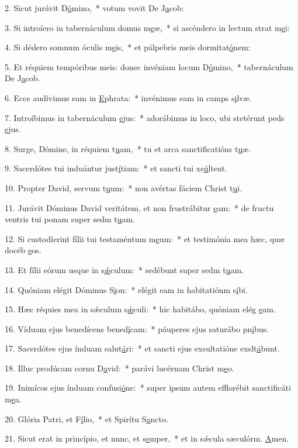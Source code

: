 2. Sicut jurávit D\uline{ó}mino,~* votum vovit De J\uline{a}cob:\par 
3. Si introíero in tabernáculum domus m\uline{e}æ,~* si ascéndero in lectum strat m\uline{e}i:\par 
4. Si dédero somnum óculis m\uline{e}is,~* et pálpebris meis dormitat\uline{ó}nem:\par 
5. Et réquiem tempóribus meis: donec invéniam locum D\uline{ó}mino,~* tabernáculum De J\uline{a}cob.\par 
6. Ecce audívimus eam in \uline{E}phrata:~* invénimus eam in camps s\uline{i}lvæ.\par 
7. Introíbimus in tabernáculum \uline{e}jus:~* adorábimus in loco, ubi stetérunt peds \uline{e}jus.\par 
8. Surge, Dómine, in réquiem t\uline{u}am,~* tu et arca sanctificatións t\uline{u}æ.\par 
9. Sacerdótes tui induántur just\uline{í}tiam:~* et sancti tui xs\uline{ú}ltent.\par 
10. Propter David, servum t\uline{u}um:~* non avértas fáciem Christ t\uline{u}i.\par 
11. Jurávit Dóminus David veritátem, et non frustrábitur \uline{e}am:~* de fructu ventris tui ponam super sedm t\uline{u}am.\par 
12. Si custodíerint fílii tui testaméntum m\uline{e}um:~* et testimónia mea hæc, quæ docéb \uline{e}os.\par 
13. Et fílii eórum usque in s\uline{ǽ}culum:~* sedébunt super sedm t\uline{u}am.\par 
14. Quóniam elégit Dóminus S\uline{i}on:~* elégit eam in habitatiónm s\uline{i}bi.\par 
15. Hæc réquies mea in sǽculum s\uline{ǽ}culi:~* hic habitábo, quóniam elég \uline{e}am.\par 
16. Víduam ejus benedícens bened\uline{í}cam:~* páuperes ejus saturábo pn\uline{i}bus.\par 
17. Sacerdótes ejus índuam salut\uline{á}ri:~* et sancti ejus exsultatióne exslt\uline{á}bunt.\par 
18. Illuc prodúcam cornu D\uline{a}vid:~* parávi lucérnam Christ m\uline{e}o.\par 
19. Inimícos ejus índuam confusi\uline{ó}ne:~* super ipsum autem efflorébit sanctificáti m\uline{e}a.\par 
20. Glória Patri, et F\uline{í}lio,~* et Spirítu S\uline{a}ncto.\par 
21. Sicut erat in princípio, et nunc, et s\uline{e}mper,~* et in sǽcula sæculórm. \uline{A}men.\par 

